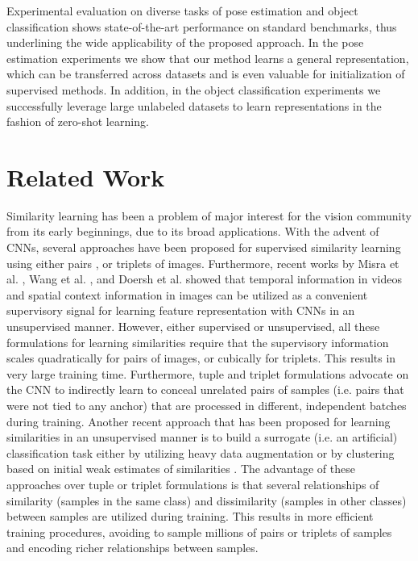 \documentclass[10pt,twocolumn,letterpaper]{article}
\begin{document}
Experimental evaluation on diverse tasks of pose estimation and object classification shows state-of-the-art performance on standard benchmarks, thus underlining the wide applicability of the proposed approach. In the pose estimation experiments we show that our method learns a general representation, which can be transferred across datasets and is even valuable for initialization of supervised methods. In addition, in the object classification experiments we successfully leverage large unlabeled datasets to learn representations in the fashion of zero-shot learning.


\section{Related Work}

Similarity learning has been a problem of major interest for the vision community from its early beginnings, due to its broad applications. With the advent of CNNs, several approaches have been proposed for supervised similarity learning using either pairs \cite{ConvNetSimPatch}, or triplets \cite{ConvNetSimTriplet} of images. Furthermore, recent works by Misra et al. \cite{shuffleandlearn}, Wang et al. \cite{ConvNetpretext2}, and Doersh et al. \cite{ConvNetpretext1} showed that temporal information in videos and spatial context information in images can be utilized as a convenient supervisory signal for learning feature representation with CNNs in an unsupervised manner. However, either supervised or unsupervised, all these formulations for learning similarities require that the supervisory information scales quadratically for pairs of images, or cubically for triplets. This results in very large training time. Furthermore, tuple and triplet formulations advocate on the CNN to indirectly learn to conceal unrelated pairs of samples (i.e. pairs that were not tied to any anchor) that are processed in different, independent batches during training. Another recent approach that has been proposed for learning similarities in an unsupervised manner is to build a surrogate (i.e. an artificial) classification task either by utilizing heavy data augmentation \cite{exemplarcnn} or by clustering based on initial weak estimates of similarities \cite{cliquecnn,pseudolabel}. The advantage of these approaches over tuple or triplet formulations is that several relationships of similarity (samples in the same class) and dissimilarity (samples in other classes) between samples are utilized during training. This results in more efficient training procedures, avoiding to sample millions of pairs or triplets of samples and encoding richer relationships between samples.
\end{document}
